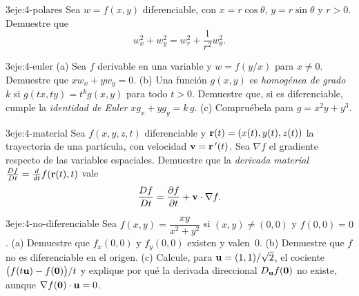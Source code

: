 \begin{ejercicio}{3}{eje:4-polares}
Sea $w=f(x,y)$ diferenciable, con $x=r\cos\theta$, $y=r\sin\theta$ y $r>0$. Demuestre que
\[
w_x^2+w_y^2=w_r^2+\frac{1}{r^2}w_\theta^2 .
\]
\end{ejercicio}

\begin{ejercicio}{3}{eje:4-euler}
(a) Sea $f$ derivable en una variable y $w=f(y/x)$ para $x\neq0$. Demuestre que $xw_x+yw_y=0$. (b) Una función $g(x,y)$ es \emph{homogénea de grado $k$} si $g(tx,ty)=t^kg(x,y)$ para todo $t>0$. Demuestre que, si es diferenciable, cumple la \emph{identidad de Euler} $xg_x+yg_y=k\,g$. (c) Compruébela para $g=x^2y+y^3$.
\end{ejercicio}

\begin{ejercicio}{3}{eje:4-material}
Sea $f(x,y,z,t)$ diferenciable y $\mathbf{r}(t)=(x(t),y(t),z(t))$ la trayectoria de una partícula, con velocidad $\mathbf{v}=\mathbf{r}\,'(t)$. Sea $\nabla f$ el gradiente respecto de las variables espaciales. Demuestre que la \emph{derivada material} $\frac{Df}{Dt}=\frac{d}{dt}f(\mathbf{r}(t),t)$ vale
\[
\frac{Df}{Dt}=\frac{\partial f}{\partial t}+\mathbf{v}\cdot\nabla f .
\]
\end{ejercicio}

\begin{ejercicio}{3}{eje:4-no-diferenciable}
Sea $f(x,y)=\dfrac{xy}{x^2+y^2}$ si $(x,y)\neq(0,0)$ y $f(0,0)=0$. (a) Demuestre que $f_x(0,0)$ y $f_y(0,0)$ existen y valen~$0$. (b) Demuestre que $f$ no es diferenciable en el origen. (c) Calcule, para $\mathbf{u}=(1,1)/\sqrt2$, el cociente $\bigl(f(t\mathbf{u})-f(\mathbf{0})\bigr)/t$ y explique por qué la derivada direccional $D_{\mathbf{u}}f(\mathbf{0})$ no existe, aunque $\nabla f(\mathbf{0})\cdot\mathbf{u}=0$.
\end{ejercicio}
